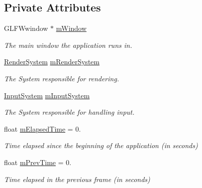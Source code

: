 \subsection*{Private Attributes}
\begin{DoxyCompactItemize}
\item 
\mbox{\label{class_vk_app_aa9f3786cdd89c262bdb749aa93a7f40b}} 
G\+L\+F\+Wwindow $\ast$ \mbox{\hyperlink{class_vk_app_aa9f3786cdd89c262bdb749aa93a7f40b}{m\+Window}}
\begin{DoxyCompactList}\small\item\em The main window the application runs in. \end{DoxyCompactList}\item 
\mbox{\label{class_vk_app_ad510071c768a36d47b1b4f9de79484d2}} 
\mbox{\hyperlink{class_render_system}{Render\+System}} \mbox{\hyperlink{class_vk_app_ad510071c768a36d47b1b4f9de79484d2}{m\+Render\+System}}
\begin{DoxyCompactList}\small\item\em The System responsible for rendering. \end{DoxyCompactList}\item 
\mbox{\label{class_vk_app_ad1f0739f9072e7b9b3c53b8ab96928f6}} 
\mbox{\hyperlink{class_input_system}{Input\+System}} \mbox{\hyperlink{class_vk_app_ad1f0739f9072e7b9b3c53b8ab96928f6}{m\+Input\+System}}
\begin{DoxyCompactList}\small\item\em The System responsible for handling input. \end{DoxyCompactList}\item 
\mbox{\label{class_vk_app_a0696ebc57902eeab46d6332ae2042a57}} 
float \mbox{\hyperlink{class_vk_app_a0696ebc57902eeab46d6332ae2042a57}{m\+Elapsed\+Time}} = 0.
\begin{DoxyCompactList}\small\item\em Time elapsed since the beginning of the application (in seconds) \end{DoxyCompactList}\item 
\mbox{\label{class_vk_app_ab3245c6f77985d0e800584cd52682354}} 
float \mbox{\hyperlink{class_vk_app_ab3245c6f77985d0e800584cd52682354}{m\+Prev\+Time}} = 0.
\begin{DoxyCompactList}\small\item\em Time elapsed in the previous frame (in seconds) \end{DoxyCompactList}\item 

\end{DoxyCompactItemize}
